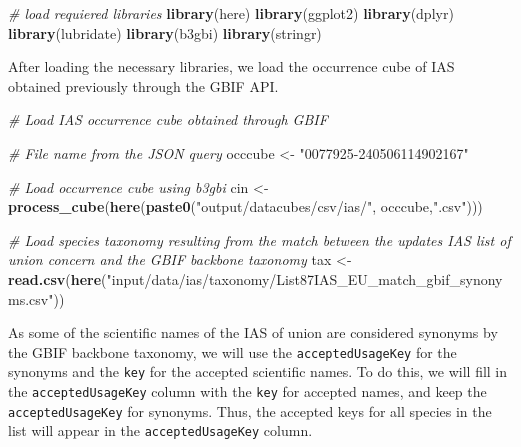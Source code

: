 \documentclass[
]{article}
\newenvironment{Shaded}{\begin{snugshade}}{\end{snugshade}}
\newcommand{\CommentTok}[1]{\textcolor[rgb]{0.56,0.35,0.01}{\textit{#1}}}
\newcommand{\FunctionTok}[1]{\textcolor[rgb]{0.13,0.29,0.53}{\textbf{#1}}}
\newcommand{\NormalTok}[1]{#1}
\newcommand{\OtherTok}[1]{\textcolor[rgb]{0.56,0.35,0.01}{#1}}
\newcommand{\StringTok}[1]{\textcolor[rgb]{0.31,0.60,0.02}{#1}}
\begin{document}
\begin{Shaded}
\begin{Highlighting}[]
\CommentTok{\# load requiered libraries}
\FunctionTok{library}\NormalTok{(here)}
\FunctionTok{library}\NormalTok{(ggplot2)}
\FunctionTok{library}\NormalTok{(dplyr)}
\FunctionTok{library}\NormalTok{(lubridate)}
\FunctionTok{library}\NormalTok{(b3gbi)}
\FunctionTok{library}\NormalTok{(stringr)}
\end{Highlighting}
\end{Shaded}

After loading the necessary libraries, we load the occurrence cube of
IAS obtained previously through the GBIF API.

\begin{Shaded}
\begin{Highlighting}[]
\CommentTok{\# Load IAS occurrence cube obtained through GBIF}

\CommentTok{\# File name from the JSON query}
\NormalTok{occcube }\OtherTok{\textless{}{-}} \StringTok{"0077925{-}240506114902167"}

\CommentTok{\# Load occurrence cube using b3gbi}
\NormalTok{cin }\OtherTok{\textless{}{-}} \FunctionTok{process\_cube}\NormalTok{(}\FunctionTok{here}\NormalTok{(}\FunctionTok{paste0}\NormalTok{(}\StringTok{"output/datacubes/csv/ias/"}\NormalTok{, occcube,}\StringTok{".csv"}\NormalTok{)))}

\CommentTok{\# Load species taxonomy resulting from the match between the updates IAS list of union concern and the GBIF backbone taxonomy}
\NormalTok{tax }\OtherTok{\textless{}{-}} \FunctionTok{read.csv}\NormalTok{(}\FunctionTok{here}\NormalTok{(}\StringTok{"input/data/ias/taxonomy/List87IAS\_EU\_match\_gbif\_synonyms.csv"}\NormalTok{))}
\end{Highlighting}
\end{Shaded}

As some of the scientific names of the IAS of union are considered
synonyms by the GBIF backbone taxonomy, we will use the
\texttt{acceptedUsageKey} for the synonyms and the \texttt{key} for the
accepted scientific names. To do this, we will fill in the
\texttt{acceptedUsageKey} column with the \texttt{key} for accepted
names, and keep the \texttt{acceptedUsageKey} for synonyms. Thus, the
accepted keys for all species in the list will appear in the
\texttt{acceptedUsageKey} column.
\end{document}
